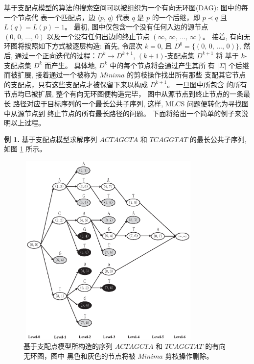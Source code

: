 基于支配点模型的算法的搜索空间可以被组织为一个有向无环图(DAG): 图中的每一个节点代
表一个匹配点，边 $\langle p,\, q \rangle$ 代表 $q$ 是 $p$ 的一个后继，即 $p
\prec q$ 且 $L(q) = L(p) + 1$。 最初, 图中仅包含一个没有任何入边的源节点 $(0,\,
0,\, ...,\, 0)$ 以及一个没有任何出边的终止节点 $(\infty,\, \infty,\, ...,\,
\infty)$。 接着, 有向无环图将按照如下方式被逐层构造: 首先, 令层次 $k =
0$, 且 $D^0 = \{(0,\, 0,\, ...,\, 0)\}$, 然后,
通过一个正向迭代的过程：$D^k \rightarrow D^{k+1}$, $(k+1)$-支配点集 $D^{k+1}$ 将
基于 $k$-支配点集 $D^k$ 而产生。 具体地, $D^k$ 中的每个节点将会通过产生其所
有 $|\Sigma|$ 个后继而被扩展, 接着通过一个被称为 $Minima$ 的剪枝操作找出所有那些
支配其它节点的支配点，只有这些支配点才被保留下来以构成 $D^{k+1}$。 一旦图中所包含
的所有节点均已被扩展, 整个有向无环图便构造完毕， 图中从源节点到终止节点的一条最长
路径对应于目标序列的一个最长公共子序列, 这样, MLCS 问题便转化为寻找图中从源节点到
终止节点的所有最长路径的问题。 下面将给出一个简单的例子来说明以上过程。

\textbf{例 1.} 基于支配点模型求解序列 $ACTAGCTA$ 和 $TCAGGTAT$ 的最长公共子序列,
如图 \ref{fig:DAG} 所示。

\begin{figure}[!h]
  \centering
  \includegraphics[height=3.8in, width=3.6in]{figures/4_MLCS/DAG}
  \vspace{1.5em}
  \caption{基于支配点模型所构造的序列 $ACTAGCTA$ 和 $TCAGGTAT$ 的有向无环图，图中
    黑色和灰色的节点将被 $Minima$ 剪枝操作删除。}
  \label{fig:DAG}
\end{figure}


